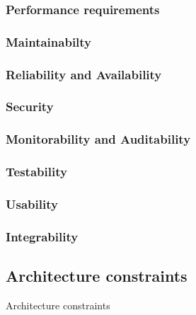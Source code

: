 \documentclass[10pt]{article}
\begin{document}
\subsubsection{Performance requirements}

\subsubsection{Maintainabilty}

\subsubsection{Reliability and Availability}

\subsubsection{Security}

\subsubsection{Monitorability and Auditability}

\subsubsection{Testability}

\subsubsection{Usability}

\subsubsection{Integrability}




\clearpage
\subsection{Architecture constraints} %
Architecture constraints
\end{document}
